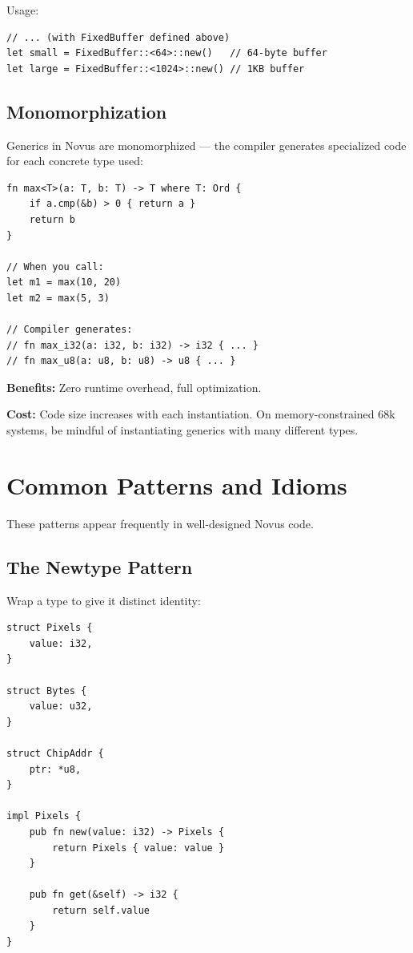 Usage:

\begin{lstlisting}
// ... (with FixedBuffer defined above)
let small = FixedBuffer::<64>::new()   // 64-byte buffer
let large = FixedBuffer::<1024>::new() // 1KB buffer
\end{lstlisting}

\subsection{Monomorphization}

Generics in Novus are monomorphized --- the compiler generates specialized code for each concrete type used:

\begin{lstlisting}
fn max<T>(a: T, b: T) -> T where T: Ord {
    if a.cmp(&b) > 0 { return a }
    return b
}

// When you call:
let m1 = max(10, 20)
let m2 = max(5, 3)

// Compiler generates:
// fn max_i32(a: i32, b: i32) -> i32 { ... }
// fn max_u8(a: u8, b: u8) -> u8 { ... }
\end{lstlisting}

\textbf{Benefits:} Zero runtime overhead, full optimization.

\textbf{Cost:} Code size increases with each instantiation. On memory-constrained 68k systems, be mindful of instantiating generics with many different types.


\section{Common Patterns and Idioms}
\label{sec:patterns}

These patterns appear frequently in well-designed Novus code.

\subsection{The Newtype Pattern}

Wrap a type to give it distinct identity:

\begin{lstlisting}
struct Pixels {
    value: i32,
}

struct Bytes {
    value: u32,
}

struct ChipAddr {
    ptr: *u8,
}

impl Pixels {
    pub fn new(value: i32) -> Pixels {
        return Pixels { value: value }
    }

    pub fn get(&self) -> i32 {
        return self.value
    }
}
\end{lstlisting}

